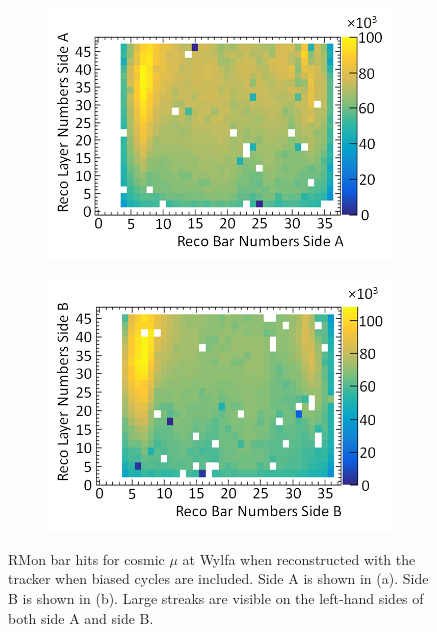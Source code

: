\begin{figure}[!h]
\centering
\begin{subfigure}{.5\textwidth}
  \centering
  \includegraphics[width=\linewidth]{Chapter6/Figs/Raster/sideAHitsWithBadCyclesMedText.png}
  \captionsetup{width=.9\linewidth}
  \caption{} 
  \label{subFig:sideAHitsWithBadCycles}
\end{subfigure}%
\begin{subfigure}{.5\textwidth}
  \centering
\includegraphics[width=\linewidth]{Chapter6/Figs/Raster/sideBHitsWithBadCyclesMedText.png}
  \captionsetup{width=.9\linewidth}
  \caption{}
  \label{subFig:sideBHitsWithBadCycles}
\end{subfigure}
\caption{RMon bar hits for cosmic $\mu$ at Wylfa when reconstructed with the tracker when biased cycles are included. Side A is shown in (a). Side B is shown in (b). Large streaks are visible on the left-hand sides of both side A and side B.}
\label{fig:sideABHitsWithBadCycles}
\end{figure}

